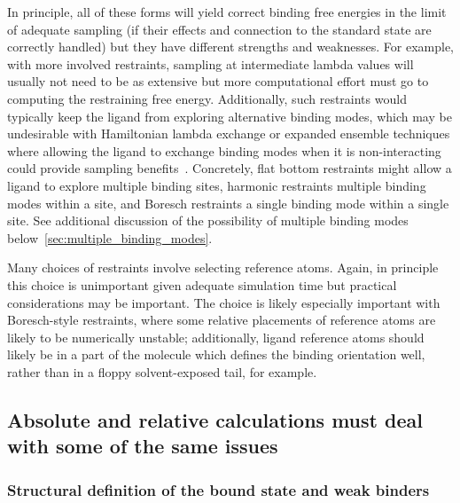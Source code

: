 \documentclass[9pt,bestpractices]{livecoms}
\begin{document}
In principle, all of these forms will yield correct binding free energies in the limit of adequate sampling (if their effects and connection to the standard state are correctly handled) but they have different strengths and weaknesses.
For example, with more involved restraints, sampling at intermediate lambda values will usually not need to be as extensive but more computational effort must go to computing the restraining free energy.
Additionally, such restraints would typically keep the ligand from exploring alternative binding modes, which may be undesirable with Hamiltonian lambda exchange or expanded ensemble techniques where allowing the ligand to exchange binding modes when it is non-interacting could provide sampling benefits~\cite{wang2013identifying}.
Concretely, flat bottom restraints might allow a ligand to explore multiple binding sites, harmonic restraints multiple binding modes within a site, and Boresch restraints a single binding mode within a single site.
See additional discussion of the possibility of multiple binding modes below~\ref{sec:multiple_binding_modes}.

Many choices of restraints involve selecting reference atoms.
Again, in principle this choice is unimportant given adequate simulation time but practical considerations may be important.
The choice is likely especially important with Boresch-style restraints, where some relative placements of reference atoms are likely to be numerically unstable; additionally, ligand reference atoms should likely be in a part of the molecule which defines the binding orientation well, rather than in a floppy solvent-exposed tail, for example.



\subsection{Absolute and relative calculations must deal with some of the same issues}

\subsubsection{Structural definition of the bound state and weak binders}
\end{document}
